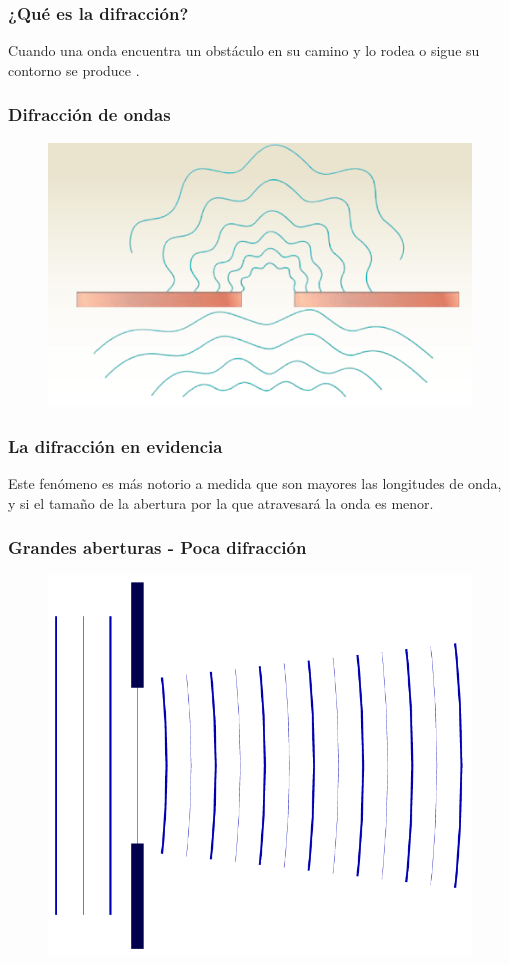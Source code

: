 \documentclass[14pt]{beamer}
\begin{document}
\begin{frame}
\frametitle{¿Qué es la difracción?}
Cuando una onda encuentra un obstáculo en su camino y lo rodea o sigue su contorno \pause se produce .
\end{frame}
\begin{frame}
\frametitle{Difracción de ondas}
\begin{figure}
    \centering
    \includegraphics[scale=0.6]{Imagenes/Difraccion_01.PNG}
\end{figure}
\end{frame}
\begin{frame}
\frametitle{La difracción en evidencia}    
Este fenómeno es más notorio a medida que son mayores las longitudes de onda, y si el tamaño de la abertura por la que atravesará la onda es menor.
\end{frame}
\begin{frame}
\frametitle{Grandes aberturas - Poca difracción}
\begin{figure}
    \centering
    \includegraphics[scale=0.25]{Imagenes/Difraccion_Patrones_01.png}
\end{figure}
\end{frame}
\end{document}
